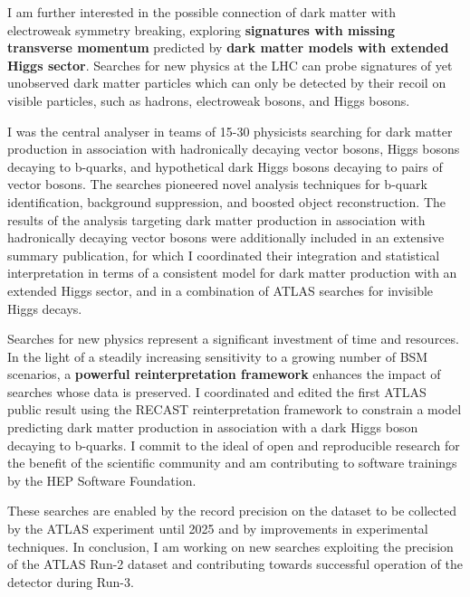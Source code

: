 \documentclass{article}
\begin{document}
\medskip

I am further interested in the possible connection of dark matter with electroweak symmetry breaking, exploring \textbf{signatures with missing transverse momentum} predicted by \textbf{dark matter models with extended Higgs sector}.
Searches for new physics at the LHC can probe signatures of yet unobserved dark matter particles which can only be detected by their recoil on visible particles, such as hadrons, electroweak bosons, and Higgs bosons.

I was the central analyser in teams of 15-30 physicists searching for dark matter production in association with hadronically decaying vector bosons, Higgs bosons decaying to b-quarks, and hypothetical dark Higgs bosons decaying to pairs of vector bosons. The searches pioneered novel analysis techniques for b-quark identification, background suppression, and boosted object reconstruction.
The results of the analysis targeting dark matter production in association with hadronically decaying vector bosons were additionally included in an extensive summary publication, for which I coordinated their integration and statistical interpretation in terms of a consistent model for dark matter production with an extended Higgs sector, and in a combination of ATLAS searches for invisible Higgs decays.
\medskip

Searches for new physics represent a significant investment of time and resources. In the light of a steadily increasing sensitivity to a growing number of BSM scenarios, a \textbf{powerful reinterpretation framework} enhances the impact of searches whose data is preserved. I coordinated and edited the first ATLAS public result using the RECAST reinterpretation framework to constrain a model predicting dark matter production in association with a dark Higgs boson decaying to b-quarks. I commit to the ideal of open and reproducible research for the benefit of the scientific community and am contributing to software trainings by the HEP Software Foundation.
\medskip

These searches are enabled by the record precision on the dataset to be collected by the ATLAS experiment until 2025 and by improvements in experimental techniques. In conclusion, I am working on new searches exploiting the precision of the ATLAS Run-2 dataset and contributing towards successful operation of the detector during Run-3.

\end{document}
